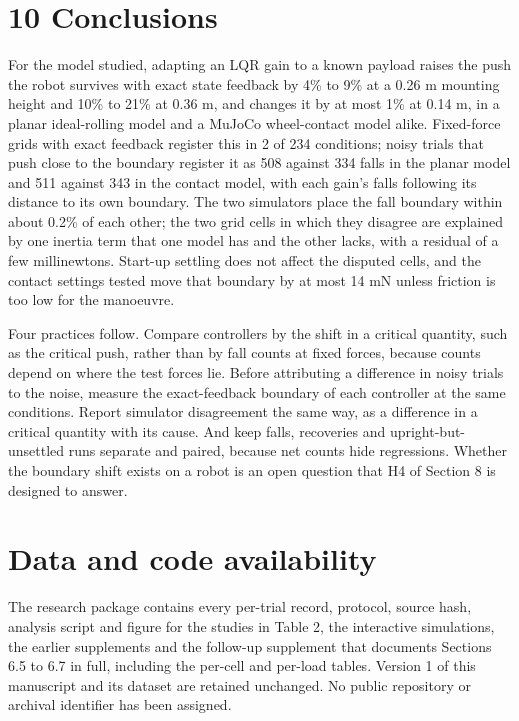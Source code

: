 \documentclass[11pt,a4paper]{article}
\begin{document}
\section*{10 Conclusions}
For the model studied, adapting an LQR gain to a known payload raises the push the robot survives with exact state feedback by 4\% to 9\% at a 0.26 m mounting height and 10\% to 21\% at 0.36 m, and changes it by at most 1\% at 0.14 m, in a planar ideal-rolling model and a MuJoCo wheel-contact model alike. Fixed-force grids with exact feedback register this in 2 of 234 conditions; noisy trials that push close to the boundary register it as 508 against 334 falls in the planar model and 511 against 343 in the contact model, with each gain's falls following its distance to its own boundary. The two simulators place the fall boundary within about 0.2\% of each other; the two grid cells in which they disagree are explained by one inertia term that one model has and the other lacks, with a residual of a few millinewtons. Start-up settling does not affect the disputed cells, and the contact settings tested move that boundary by at most 14 mN unless friction is too low for the manoeuvre.

Four practices follow. Compare controllers by the shift in a critical quantity, such as the critical push, rather than by fall counts at fixed forces, because counts depend on where the test forces lie. Before attributing a difference in noisy trials to the noise, measure the exact-feedback boundary of each controller at the same conditions. Report simulator disagreement the same way, as a difference in a critical quantity with its cause. And keep falls, recoveries and upright-but-unsettled runs separate and paired, because net counts hide regressions. Whether the boundary shift exists on a robot is an open question that H4 of Section 8 is designed to answer.

\section*{Data and code availability}
The research package contains every per-trial record, protocol, source hash, analysis script and figure for the studies in Table 2, the interactive simulations, the earlier supplements and the follow-up supplement that documents Sections 6.5 to 6.7 in full, including the per-cell and per-load tables. Version 1 of this manuscript and its dataset are retained unchanged. No public repository or archival identifier has been assigned.
\end{document}
